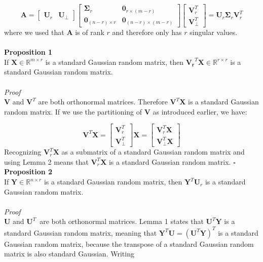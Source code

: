 \documentclass{article}
\begin{document}
\begin{equation*}
\mathbf{A} = \begin{bmatrix}
	\mathbf{U}_r & \mathbf{U}_{\perp} \end{bmatrix} \begin{bmatrix}\mathbf{\Sigma}_r & \mathbf{0}_{r\times(m-r)} \\ \mathbf{0}_{(n-r) \times r} & \mathbf{0}_{(n-r)\times (m-r)} 
\end{bmatrix} \begin{bmatrix} \mathbf{V}_r^T \\ \mathbf{V}_\perp^T\end{bmatrix}	= \mathbf{U}_r\mathbf{\Sigma}_r\mathbf{V}_r^T	
\end{equation*}
where we used that $\mathbf{A}$ is of rank $r$ and therefore only has $r$ singular values. 
\\\\
\textbf{Proposition 1} \\
If $\mathbf{X} \in \mathbb{R}^{m \times r}$ is a standard Gaussian random matrix, then $\mathbf{V_r}^T\mathbf{X} \in \mathbb{R}^{r \times r}$ is a standard Gaussian random matrix. \\\\
\textit{Proof}\\
$\mathbf{V}$ and $\mathbf{V}^T$ are both orthonormal matrices. Therefore $\mathbf{V}^T\mathbf{X}$ is a standard Gaussian random matrix. If we use the partitioning of $\mathbf{V}$ as introduced earlier, we have:

\begin{equation}
\mathbf{V}^T\mathbf{X} = \begin{bmatrix} \mathbf{V}_r^T \\ \mathbf{V}_\perp^T\end{bmatrix}	\mathbf{X} = \begin{bmatrix}
	\mathbf{V}_r^T \mathbf{X} \\
	\mathbf{V}_\perp^T\mathbf{X}
\end{bmatrix}
\end{equation}
Recognizing $\mathbf{V}_r^T\mathbf{X}$ as a submatrix of a standard Gaussian random matrix and using Lemma 2 means that $\mathbf{V}_r^T\mathbf{X}$ is a standard Gaussian random matrix.  $\square$
\clearpage
\noindent \textbf{Proposition 2}\\
If $\mathbf{Y} \in \mathbb{R}^{n \times r}$ is a standard Gaussian random matrix, then $\mathbf{Y}^T\mathbf{U}_r$ is a standard Gaussian random matrix. \\\\
\textit{Proof}\\
$\mathbf{U}$ and $\mathbf{U}^T$ are both orthonormal matrices. Lemma 1 states that $\mathbf{U}^T\mathbf{Y}$ is a standard Gaussian random matrix, meaning that $\mathbf{Y}^T\mathbf{U}= \left(\mathbf{U}^T\mathbf{Y}\right)^T$ is a standard Gaussian random matrix, because the transpose of a standard Gaussian random matrix is also standard Gaussian. Writing
\end{document}
